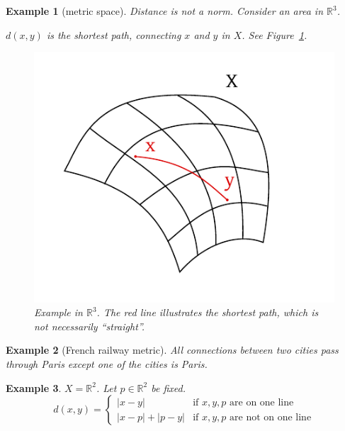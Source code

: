 \documentclass{article}
\newtheorem{example}{Example}  \numberwithin{example}{section}
\newcommand{\card}[1]{\left|#1\right|}
\begin{document}
\begin{example}[metric space]
  Distance is not a norm.
  Consider an area in $\mathbb R^3$.

  $d(x,y)$ is the shortest path, connecting $x$ and $y$ in $X$.
  See Figure~\ref{img:example-r3}.

  \begin{figure}
    \begin{center}
      \includegraphics{img/01_example.pdf}
      \caption{Example in $\mathbb R^3$. The red line illustrates the shortest path, which is not necessarily \enquote{straight}.}
      \label{img:example-r3}
    \end{center}
  \end{figure}
\end{example}

\begin{example}[French railway metric]
  All connections between two cities pass through Paris except one of the cities is Paris.
\end{example}

\begin{example}
  $X = \mathbb R^2$. Let $p \in \mathbb R^2$ be fixed.
  \[
    d(x, y) = \begin{cases}
      \card{x - y}                & \text{if } x, y, p \text{ are on one line} \\
      \card{x - p} + \card{p - y} & \text{if } x, y, p \text{ are not on one line}
    \end{cases}
  \]
\end{example}
\end{document}
